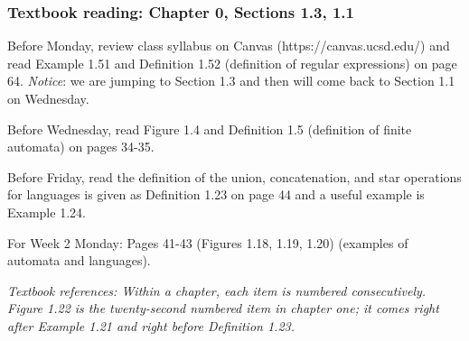 \subsubsection*{Textbook reading: Chapter 0, Sections 1.3, 1.1}

\vspace{-15pt}

Before Monday, review class syllabus on Canvas (https://canvas.ucsd.edu/) and 
read Example 1.51 and Definition 1.52 (definition of regular expressions) on page 64.
{\it Notice}: we are jumping to Section 1.3 and then will come back 
to Section 1.1 on Wednesday.

Before Wednesday, read Figure 1.4 and Definition 1.5 (definition of finite automata) on pages 34-35.

Before Friday, read the definition of the union, concatenation, and star operations for languages is given 
as Definition 1.23 on page 44 and a useful example is Example 1.24.

For Week 2 Monday: Pages 41-43 (Figures 1.18, 1.19, 1.20) (examples of automata and languages).


{\it Textbook references: Within a chapter, each item is numbered consecutively. Figure 1.22
is the twenty-second numbered item in chapter one; it comes right after Example 1.21 and right before Definition 1.23.}


